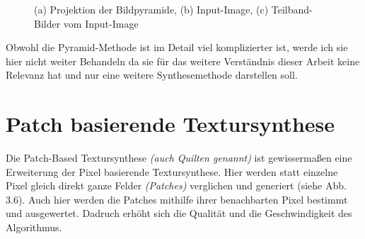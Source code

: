 \documentclass[12pt]{report}
\begin{document}
\begin{figure}[H]
    \centering
    \qquad
    \qquad
    \caption{(a) Projektion der Bildpyramide, (b) Input-Image, (c) Teilband-Bilder vom Input-Image}%
\end{figure}

Obwohl die Pyramid-Methode ist im Detail viel komplizierter ist,
werde ich sie hier nicht weiter Behandeln da sie für das weitere Verständnis dieser Arbeit keine Relevanz hat und nur eine weitere Synthesemethode darstellen soll.

\section{Patch basierende Textursynthese}

Die Patch-Based Textursynthese \textit{(auch Quilten genannt)} ist gewissermaßen eine Erweiterung der Pixel basierende Textursynthese.
Hier werden statt einzelne Pixel gleich direkt ganze Felder \textit{(Patches)} verglichen und generiert {(siehe Abb. 3.6)}.
Auch hier werden die Patches mithilfe ihrer benachbarten Pixel bestimmt und ausgewertet.
Dadruch erhöht sich die Qualität und die Geschwindigkeit des Algorithmus.
\end{document}
